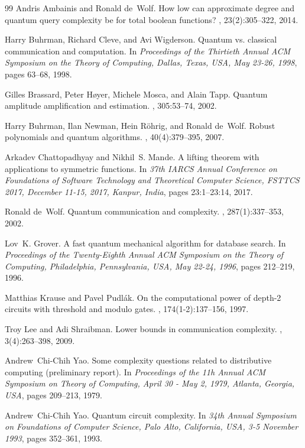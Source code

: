 \documentclass[10pt,a4paper]{article}
\theoremstyle{definition}
\begin{document}
\begin{thebibliography}{99}
Andris Ambainis and Ronald de~Wolf.
\newblock How low can approximate degree and quantum query complexity be for
  total boolean functions?
, 23(2):305--322, 2014.

Harry Buhrman, Richard Cleve, and Avi Wigderson.
\newblock Quantum vs. classical communication and computation.
\newblock In {\em Proceedings of the Thirtieth Annual {ACM} Symposium on the
  Theory of Computing, Dallas, Texas, USA, May 23-26, 1998}, pages 63--68,
  1998.

Gilles Brassard, Peter H{\o}yer, Michele Mosca, and Alain Tapp.
\newblock Quantum amplitude amplification and estimation.
, 305:53--74, 2002.

Harry Buhrman, Ilan Newman, Hein R{\"{o}}hrig, and Ronald de~Wolf.
\newblock Robust polynomials and quantum algorithms.
, 40(4):379--395, 2007.

Arkadev Chattopadhyay and Nikhil~S. Mande.
\newblock A lifting theorem with applications to symmetric functions.
\newblock In {\em 37th {IARCS} Annual Conference on Foundations of Software
  Technology and Theoretical Computer Science, {FSTTCS} 2017, December 11-15,
  2017, Kanpur, India}, pages 23:1--23:14, 2017.

Ronald de~Wolf.
\newblock Quantum communication and complexity.
, 287(1):337--353, 2002.

Lov~K. Grover.
\newblock A fast quantum mechanical algorithm for database search.
\newblock In {\em Proceedings of the Twenty-Eighth Annual {ACM} Symposium on
  the Theory of Computing, Philadelphia, Pennsylvania, USA, May 22-24, 1996},
  pages 212--219, 1996.

Matthias Krause and Pavel Pudl{\'{a}}k.
\newblock On the computational power of depth-2 circuits with threshold and
  modulo gates.
, 174(1-2):137--156, 1997.

Troy Lee and Adi Shraibman.
\newblock Lower bounds in communication complexity.
,
  3(4):263--398, 2009.

Andrew~Chi{-}Chih Yao.
\newblock Some complexity questions related to distributive computing
  (preliminary report).
\newblock In {\em Proceedings of the 11h Annual {ACM} Symposium on Theory of
  Computing, April 30 - May 2, 1979, Atlanta, Georgia, {USA}}, pages 209--213,
  1979.

Andrew~Chi{-}Chih Yao.
\newblock Quantum circuit complexity.
\newblock In {\em 34th Annual Symposium on Foundations of Computer Science,
  Palo Alto, California, USA, 3-5 November 1993}, pages 352--361, 1993.

\end{thebibliography}
\end{document}
